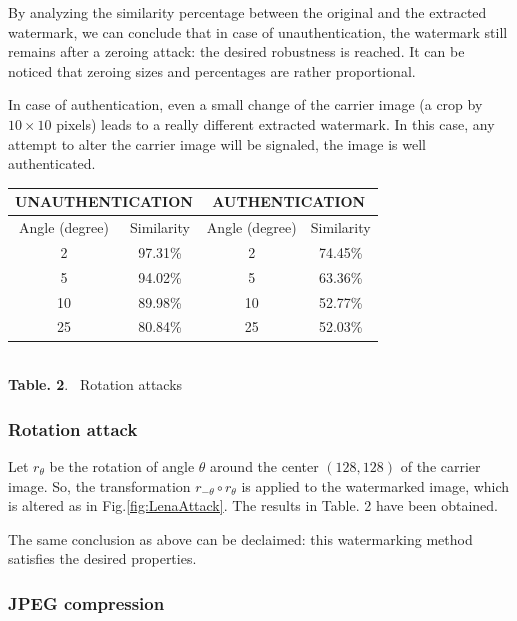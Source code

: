 By analyzing the similarity percentage between the original and the
extracted watermark, we can conclude that in case of unauthentication, the
watermark still remains after a zeroing attack: the desired robustness is
reached. It can be noticed that zeroing sizes and percentages are rather
proportional.

In case of authentication, even a small change of the carrier image (a crop
by $10\times 10$ pixels) leads to a really different extracted watermark.
In this case, any attempt to alter the carrier image will be signaled, the
image is well authenticated.
\begin{center}
\begin{footnotesize}
\begin{tabular}{|c|c||c|c|}

\hline
\multicolumn{2}{|c||}{UNAUTHENTICATION}  & \multicolumn{2}{c|}{AUTHENTICATION}\\ 
\hline
Angle (degree) & Similarity & Angle (degree) & Similarity \\
 \hline
2 & 97.31\% & 2 & 74.45\% \\
5 & 94.02\% & 5 & 63.36\% \\
10 & 89.98\% & 10 & 52.77\% \\
25 & 80.84\% & 25 & 52.03\% \\
\hline
\end{tabular}
\end{footnotesize}\\
\vspace{0.5cm}
\textbf{Table. 2}. ~Rotation attacks
\end{center}

\subsubsection{Rotation attack}

Let $r_{\theta }$ be the rotation of angle $\theta $ around the center $%
(128, 128)$ of the carrier image. So, the transformation $r_{-\theta }\circ
r_{\theta }$ is applied to the watermarked image, which is altered as in Fig.\ref{fig:LenaAttack}. The results in Table. 2 have been obtained.




The same conclusion as above can be declaimed: this watermarking method
satisfies the desired properties.

\subsubsection{JPEG compression}

